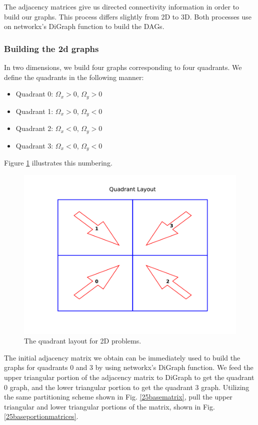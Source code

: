 The adjacency matrices give us directed connectivity information in order to build our graphs. This process differs slightly from 2D to 3D. Both processes use on networkx's DiGraph function to build the DAGs.

\subsubsection{Building the 2d graphs}
In two dimensions, we build four graphs corresponding to four quadrants. 
We define the quadrants in the following manner:
\begin{itemize}
  \item Quadrant 0: $\Omega_x > 0$, $\Omega_y > 0$
  \item Quadrant 1: $\Omega_x > 0$, $\Omega_y < 0$
  \item Quadrant 2: $\Omega_x < 0$, $\Omega_y > 0$
  \item Quadrant 3: $\Omega_x < 0$, $\Omega_y < 0$
\end{itemize}
Figure \ref{quadrant_layout} illustrates this numbering.
\begin{figure}[H]
\centering
\includegraphics{figures/quadrant_layout.pdf}
\caption{The quadrant layout for 2D problems.}
\label{quadrant_layout}
\end{figure}
The initial adjacency matrix we obtain can be immediately used to build the graphs for quadrants 0 and 3 by using networkx's DiGraph function.
We feed the upper triangular portion of the adjacency matrix to DiGraph to get the quadrant 0 graph, and the lower triangular portion to get the quadrant 3 graph.
Utilizing the same partitioning scheme shown in Fig. \ref{25basematrix}, pull the upper triangular and lower triangular portions of the matrix, shown in Fig. \ref{25baseportionmatrices}.
